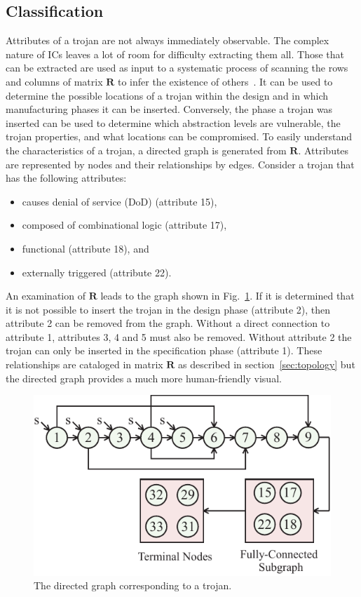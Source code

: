 \subsection{Classification}  \label{sec:techniqueClassification}
Attributes of a trojan are not always immediately observable.
The complex nature of \acrshort{IC}s leaves a lot of room for difficulty extracting them all.
Those that can be extracted are used as input to a systematic process of scanning the rows and columns of matrix $\mathbf{R}$ to infer the existence of others~\cite{samerAttribute,samerDissertation}.
It can be used to determine the possible locations of a trojan within the design and in which manufacturing phases it can be inserted.
Conversely, the phase a trojan was inserted can be used to determine which abstraction levels are vulnerable,
the trojan properties, and what locations can be compromised.
To easily understand the characteristics of a trojan, a directed graph is generated from $\mathbf{R}$.
Attributes are represented by nodes and their relationships by edges.\newline\newline
Consider a trojan that has the following attributes:
\begin{itemize}
	\item causes denial of service (DoD) (attribute 15),
	\item composed of combinational logic (attribute 17),
	\item functional (attribute 18), and
	\item externally triggered (attribute 22).
\end{itemize}
An examination of $\mathbf{R}$ leads to the graph shown in Fig.~\ref{fig:full2}.
If it is determined that it is not possible to insert the trojan in the design phase (attribute 2), then
attribute 2 can be removed from the graph.
Without a direct connection to attribute 1, attributes 3, 4 and 5 must also be removed.
Without attribute 2 the trojan can only be inserted in the specification phase (attribute 1).
These relationships are cataloged in matrix $\mathbf{R}$ as described in section~\ref{sec:topology} but the directed graph provides a much more human-friendly visual.
\begin{figure}[]
	\centering
	\includegraphics[width=0.6\linewidth]{figures/full2}
	\caption{The directed graph corresponding to a trojan.}
	\label{fig:full2}
\end{figure}
